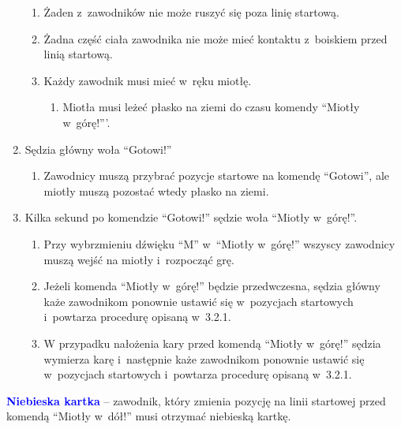 \documentclass[12pt]{article}
\newcommand\bluecard[1]{\bgroup\textcolor{blue}{\textbf{#1}}}
\begin{document}
\begin{enumerate}
	      \begin{enumerate}
		      \item
		            Żaden z~zawodników nie może ruszyć się poza linię startową.
		      \item
		            Żadna część ciała zawodnika nie może mieć kontaktu z~boiskiem przed
		            linią startową.
		      \item
		            Każdy zawodnik musi mieć w~ręku miotłę.

		            \begin{enumerate}
			            \item
			                  Miotła musi leżeć płasko na ziemi do czasu komendy ``Miotły w~górę!'''.
		            \end{enumerate}
	      \end{enumerate}
	\item
	      Sędzia główny woła ``Gotowi!''

	      \begin{enumerate}
		      \item
		            Zawodnicy muszą przybrać pozycje startowe na komendę ``Gotowi'', ale
		            miotły muszą pozostać wtedy płasko na ziemi.
	      \end{enumerate}
	\item
	      Kilka sekund po komendzie ``Gotowi!'' sędzie woła ``Miotły w~górę!''.

	      \begin{enumerate}
		      \item
		            Przy wybrzmieniu dźwięku ``M'' w~``Miotły w~górę!'' wszyscy
		            zawodnicy muszą wejść na miotły i~rozpocząć grę.
		      \item
		            Jeżeli komenda ``Miotły w~górę!'' będzie przedwczesna, sędzia główny
		            każe zawodnikom ponownie ustawić się w~pozycjach startowych i~powtarza procedurę opisaną w~3.2.1.
		      \item
		            W przypadku nałożenia kary przed komendą ``Miotły w~górę!'' sędzia
		            wymierza karę i~następnie każe zawodnikom ponownie ustawić się w~pozycjach startowych i~powtarza procedurę opisaną w~3.2.1.
	      \end{enumerate}
\end{enumerate}

\bluecard{Niebieska kartka} -- zawodnik, który zmienia pozycję na linii
startowej przed komendą ``Miotły w~dół!'' musi otrzymać niebieską
kartkę.
\end{document}
